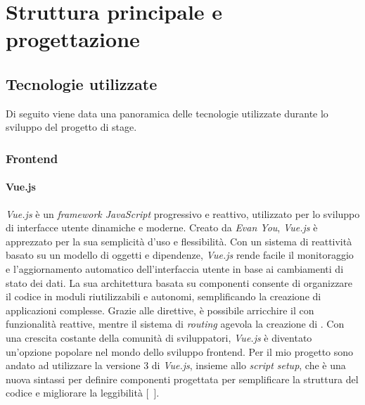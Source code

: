 \chapter{Struttura principale e progettazione}\label{cap:struttura-progettazione}


\section{Tecnologie utilizzate}\label{sec:tecnologie-utilizzate}
Di seguito viene data una panoramica delle tecnologie utilizzate durante lo sviluppo del progetto di stage.

\subsection{Frontend}\label{subsec:frontend}
\subsubsection{Vue.js}\label{subsubsec:vue}
\textit{Vue.js} è un \textit{framework JavaScript} progressivo e reattivo, utilizzato per lo sviluppo di interfacce utente dinamiche e moderne. 
Creato da \textit{Evan You}, \textit{Vue.js} è apprezzato per la sua semplicità d'uso e flessibilità. Con un sistema di reattività basato su un modello di oggetti e dipendenze, 
\textit{Vue.js} rende facile il monitoraggio e l'aggiornamento automatico dell'interfaccia utente in base ai cambiamenti di stato dei dati. La sua architettura basata 
su componenti consente di organizzare il codice in moduli riutilizzabili e autonomi, semplificando la creazione di applicazioni complesse. 
Grazie alle direttive, è possibile arricchire il  con funzionalità reattive, mentre il sistema di \textit{routing} agevola la creazione di . 
Con una crescita costante della comunità di sviluppatori, \textit{Vue.js} è diventato un'opzione popolare nel mondo dello sviluppo frontend.
Per il mio progetto sono andato ad utilizzare la versione 3 di \textit{Vue.js}, insieme allo \textit{script setup}, che è una nuova sintassi per definire componenti progettata per semplificare la struttura del codice e migliorare la leggibilità [~\cite{site:vue.js}].

